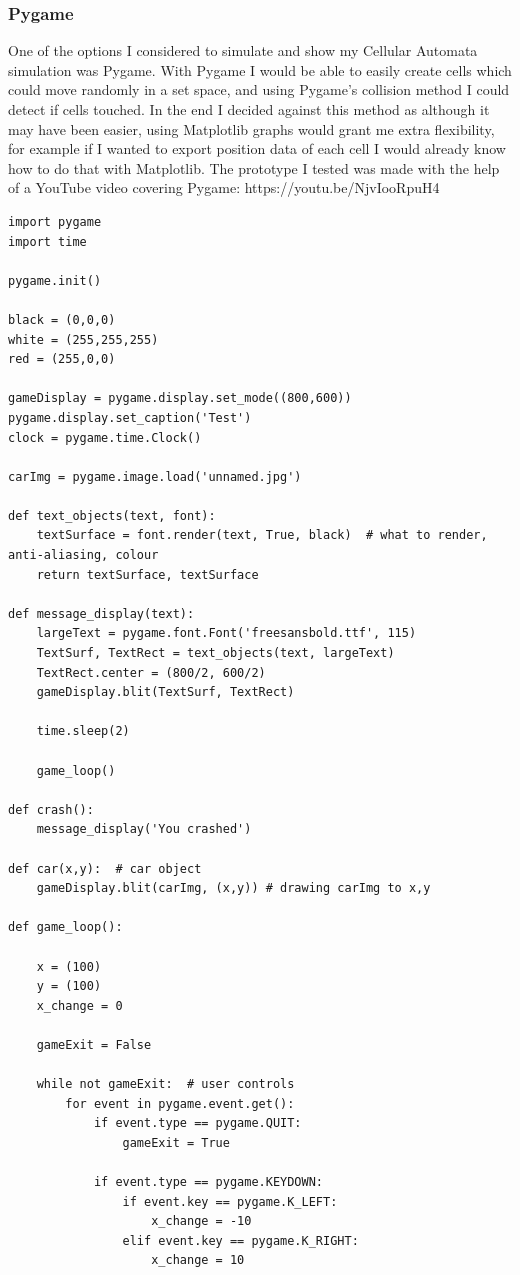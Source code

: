 \documentclass[11pt, a4paper]{article}
\begin{document}
\subsubsection{Pygame}
One of the options I considered to simulate and show my Cellular Automata simulation was Pygame. With Pygame I would be able to easily create cells which could move randomly in a set space, and using Pygame's collision method I could detect if cells touched. In the end I decided against this method as although it may have been easier, using Matplotlib graphs would grant me extra flexibility, for example if I wanted to export position data of each cell I would already know how to do that with Matplotlib. The prototype I tested was made with the help of a YouTube video covering Pygame: https://youtu.be/NjvIooRpuH4
\begin{lstlisting}
import pygame
import time

pygame.init()

black = (0,0,0)
white = (255,255,255)
red = (255,0,0)

gameDisplay = pygame.display.set_mode((800,600))
pygame.display.set_caption('Test')
clock = pygame.time.Clock()

carImg = pygame.image.load('unnamed.jpg')

def text_objects(text, font):
    textSurface = font.render(text, True, black)  # what to render, anti-aliasing, colour
    return textSurface, textSurface

def message_display(text):
    largeText = pygame.font.Font('freesansbold.ttf', 115)
    TextSurf, TextRect = text_objects(text, largeText)
    TextRect.center = (800/2, 600/2)
    gameDisplay.blit(TextSurf, TextRect)

    time.sleep(2)

    game_loop()

def crash():
    message_display('You crashed')

def car(x,y):  # car object
    gameDisplay.blit(carImg, (x,y)) # drawing carImg to x,y

def game_loop():

    x = (100)
    y = (100)
    x_change = 0

    gameExit = False

    while not gameExit:  # user controls
        for event in pygame.event.get():
            if event.type == pygame.QUIT:
                gameExit = True

            if event.type == pygame.KEYDOWN:
                if event.key == pygame.K_LEFT:
                    x_change = -10
                elif event.key == pygame.K_RIGHT:
                    x_change = 10


\end{lstlisting}
\end{document}
